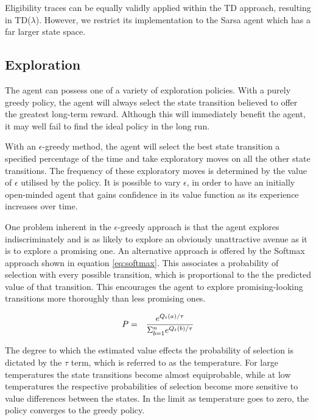 \documentclass{rucsthesis}
\begin{document}
Eligibility traces can be equally validly applied within the TD approach, resulting in TD($\lambda$). However, we restrict its implementation to the Sarsa agent which has a far larger state space.

\subsection{Exploration}

The agent can possess one of a variety of exploration policies. With a purely greedy policy, the agent will always select the state transition believed to offer the greatest long-term reward. Although this will immediately benefit the agent, it may well fail to find the ideal policy in the long run. 

With an $\epsilon$-greedy method, the agent will select the best state transition a specified percentage of the time and take exploratory moves on all the other state transitions. The frequency of these exploratory moves is determined by the value of $\epsilon$ utilised by the policy. It is possible to vary $\epsilon$, in order to have an initially open-minded agent that gains confidence in its value function as its experience increases over time. 

One problem inherent in the $\epsilon$-greedy approach is that the agent explores indiscriminately and is as likely to explore an obviously unattractive avenue as it is to explore a promising one. An alternative approach is offered by the Softmax approach shown in equation \ref{eq:softmax}. This associates a probability of selection with every possible transition, which is proportional to the the predicted value of that transition. This encourages the agent to explore promising-looking transitions more thoroughly than less promising ones.

\begin{eqnarray}
\centering
P & = & \frac{e^{Q_{t}(a)/\tau}}{\Sigma_{b=1}^{n}e^{Q_{t}(b)/\tau}} \label{eq:softmax}
\end{eqnarray}

The degree to which the estimated value effects the probability of selection is dictated by the $\tau$ term, which is referred to as the temperature. For large temperatures the state transitions become almost equiprobable, while at low temperatures the respective probabilities of selection become more sensitive to value differences between the states.  In the limit as temperature goes to zero, the policy converges to the greedy policy.
\end{document}

